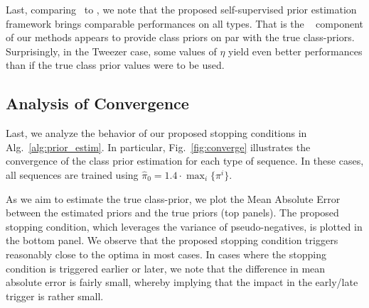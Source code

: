 Last, comparing \SSnnPUKSP~to \SSnnPUTrue, we note that the proposed self-supervised prior estimation framework brings comparable performances on all types. That is the \SSnnPU~ component of our methods appears to provide class priors on par with the true class-priors. Surprisingly, in the Tweezer case, some values of $\eta$ yield even better performances than if the true class prior values were to be used.


\subsection{Analysis of Convergence}
\label{sec:convergence}

Last, we analyze the behavior of our proposed stopping conditions in Alg.~\ref{alg:prior_estim}. In particular, Fig.~\ref{fig:converge} illustrates the convergence of the class prior estimation for each type of sequence. In these cases, all sequences are trained using $\hat\pi_{0}= 1.4 \cdot \max_i \{\pi^i\}$.

As we aim to estimate the true class-prior, we plot the Mean Absolute Error between the estimated priors and the true priors (top panels).
The proposed stopping condition, which leverages the variance of pseudo-negatives, is plotted in the bottom panel. We observe that the proposed stopping condition triggers reasonably close to the optima in most cases. In cases where the stopping condition is triggered earlier or later, we note that the difference in mean absolute error is fairly small, whereby implying that the impact in the early/late trigger is rather small. 


